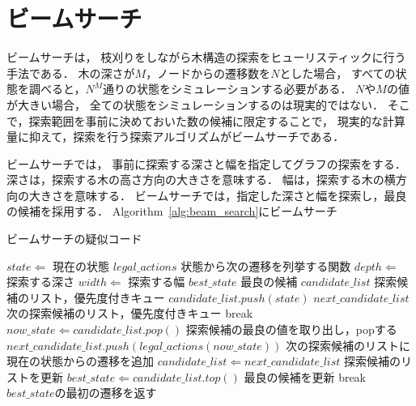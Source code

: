 \section{ビームサーチ}
ビームサーチ\cite{bisiani1992beam}は，
枝刈りをしながら木構造の探索をヒューリスティックに行う手法である．
木の深さが$M$，ノードからの遷移数を$N$とした場合，
すべての状態を調べると，$N^M$通りの状態をシミュレーションする必要がある．
$N$や$M$の値が大きい場合，
全ての状態をシミュレーションするのは現実的ではない．
そこで，探索範囲を事前に決めておいた数の候補に限定することで，
現実的な計算量に抑えて，探索を行う探索アルゴリズムがビームサーチである．
\par
ビームサーチでは，
事前に探索する深さと幅を指定してグラフの探索をする．
深さは，探索する木の高さ方向の大きさを意味する．
幅は，探索する木の横方向の大きさを意味する．
ビームサーチでは，指定した深さと幅を探索し，最良の候補を採用する．
Algorithm~\ref{alg:beam_search}にビームサーチ
\begin{algorithm}[tbp]
  \caption{ビームサーチの疑似コード}
  \label{alg:beam_search}
  \begin{algorithmic}[1]
    \Require $state \Leftarrow$ 現在の状態
    \Require $legal\_actions$ 状態から次の遷移を列挙する関数  
    \Require $depth \Leftarrow$ 探索する深さ
    \Require $width \Leftarrow$ 探索する幅
    \State $best\_state$ 最良の候補
    \State $candidate\_list$ 探索候補のリスト，優先度付きキュー
    \State $candidate\_list.push(state)$
      \State $next\_candidate\_list$ 次の探索候補のリスト，優先度付きキュー
        \State break
      \EndIf
      \State $now\_state \Leftarrow candidate\_list.pop()$ 探索候補の最良の値を取り出し，popする
      \State $next\_candidate\_list.push(legal\_actions(now\_state))$ 次の探索候補のリストに現在の状態からの遷移を追加
      \EndFor
      \State $candidate\_list \Leftarrow next\_candidate\_list$ 探索候補のリストを更新
      \State $best\_state \Leftarrow candidate\_list.top()$ 最良の候補を更新
        \State break
      \EndIf
    \EndFor
    \State \Return $best\_state$の最初の遷移を返す
  \end{algorithmic}
\end{algorithm}

